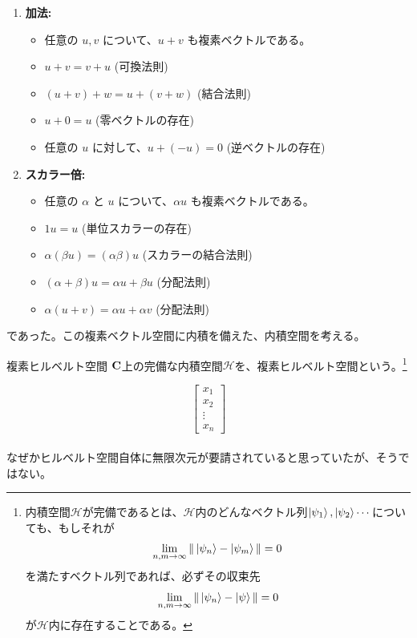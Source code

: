 \documentclass[a4paper,11pt]{jsarticle}
\begin{document}
\begin{enumerate}
    \item \textbf{加法:}
    \begin{itemize}
        \item 任意の \( u, v \) について、\( u + v \) も複素ベクトルである。
        \item \( u + v = v + u \) (可換法則)
        \item \( (u + v) + w = u + (v + w) \) (結合法則)
        \item \( u + 0 = u \) (零ベクトルの存在)
        \item 任意の \( u \) に対して、\( u + (-u) = 0 \) (逆ベクトルの存在)
    \end{itemize}
    
    \item \textbf{スカラー倍:}
    \begin{itemize}
        \item 任意の \( \alpha \) と \( u \) について、\( \alpha u \) も複素ベクトルである。
        \item \( 1u = u \) (単位スカラーの存在)
        \item \( \alpha(\beta u) = (\alpha \beta) u \) (スカラーの結合法則)
        \item \( (\alpha + \beta)u = \alpha u + \beta u \) (分配法則)
        \item \( \alpha(u + v) = \alpha u + \alpha v \) (分配法則)
    \end{itemize}
\end{enumerate}
であった。この複素ベクトル空間に内積を備えた、内積空間を考える。
\begin{itembox}[l]{複素ヒルベルト空間}
\textbf{$\vb C$}上の完備な内積空間$\mathcal{H}$を、複素ヒルベルト空間という。\footnote
{
内積空間$\mathcal{H}$が完備であるとは、$\mathcal{H}$内のどんなベクトル列$\ket{\psi_1},\ket{\psi_2}\cdots$についても、もしそれが
\begin{align}
\lim_{n,m \to \infty} \|\ket{\psi_n}-\ket{\psi_m}\|=0
\end{align}
を満たすベクトル列であれば、必ずその収束先
\begin{align}
\lim_{n,m \to \infty} \|\ket{\psi_n}-\ket{\psi}\|=0
\end{align}
が$\mathcal H$内に存在することである。
}
\end{itembox}
\[
\begin{bmatrix}
x_{1} \\
x_{2} \\
\vdots \\
x_{n}
\end{bmatrix}
\]
\\
なぜかヒルベルト空間自体に無限次元が要請されていると思っていたが、そうではない。\\
\end{document}
